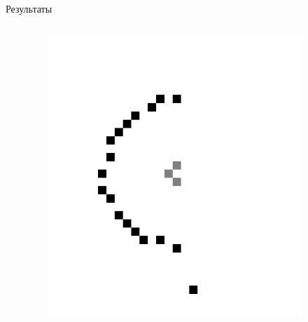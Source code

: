 \documentclass[9pt]{beamer}
\begin{document}
\begin{frame}{Результаты}
\begin{columns}
\begin{column}{0.5\textwidth}
\end{column}
\begin{column}{0.5\textwidth}
  \begin{figure}[h]
    \centering
    \includegraphics[width=0.9\textwidth]{arc_ex.png}
  \end{figure}
\end{column}
\end{columns}
\end{frame}
\end{document}
